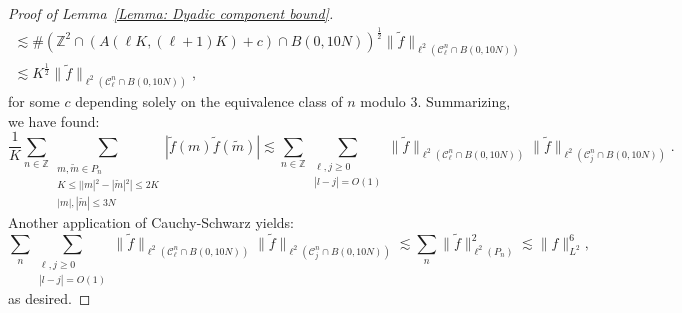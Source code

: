 \documentclass[12pt, letterpaper]{amsart}
\begin{document}
\begin{proof}[Proof of Lemma~\ref{Lemma: Dyadic component bound}]
\begin{multline*}
    \lesssim \#(\mathbb{Z}^2\cap \left(A(\ell K, (\ell+1)K)+c\right)\cap B(0,10N))^\frac{1}{2}\|\tilde{f}\|_{\ell^2(\mathcal{C}_\ell^n\cap B(0,10N))}\\
    \lesssim K^\frac{1}{2}\|\tilde{f}\|_{\ell^2(\mathcal{C}_\ell^n\cap B(0,10N))},
    \end{multline*}
    for some $c$ depending solely on the equivalence class of $n$ modulo $3$. Summarizing, we have found:
    \begin{equation*}
        \frac{1}{K}\sum_{n\in\mathbb{Z}}\sum_{\substack{m,\tilde{m}\in P_n\\K\leq | |m|^2-|\tilde{m}|^2|\leq 2K\\ |m|,|\tilde{m}|\leq 3N}}|\tilde{f}(m)\tilde{f}(\tilde{m})|
        \lesssim 
        \sum_{n\in\mathbb{Z}}\sum_{\substack{\ell,j\geq 0\\|l-j|=O(1)}}\|\tilde{f}\|_{\ell^2(\mathcal{C}_\ell^n\cap B(0,10N))}\|\tilde{f}\|_{\ell^2(\mathcal{C}_j^n\cap B(0,10N))}.
    \end{equation*}
    Another application of Cauchy-Schwarz yields:
    \[
\sum_{n}\sum_{\substack{\ell,j\geq 0\\|l-j|=O(1)}}\|\tilde{f}\|_{\ell^2(\mathcal{C}_\ell^n\cap B(0,10N))}\|\tilde{f}\|_{\ell^2(\mathcal{C}_j^n\cap B(0,10N))}\lesssim \sum_n\|\tilde{f}\|_{\ell^2(P_n)}^2\lesssim \|f\|_{L^2}^6,
    \]
    as desired.
\end{proof}
\end{document}

